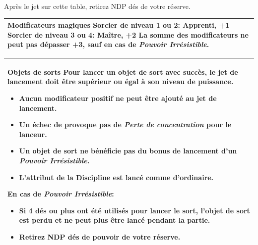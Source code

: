 \begin{table}[h!]
\begin{minipage}[t]{.5\linewidth}
\bigskip
Après le jet sur cette table, retirez NDP dés de votre réserve.
\smallskip

\begin{tabular}{|m{8cm}|}
\hline
\textbf{Modificateurs magiques}
\newline Sorcier de niveau 1 ou 2: Apprenti, +1
\newline Sorcier de niveau 3 ou 4: Maître, +2
\newline La somme des modificateurs ne peut pas dépasser +3, sauf en cas de \emph{Pouvoir Irrésistible}. \tabularnewline
\hline
\end{tabular}

\bigskip

\begin{tabular}{|m{8cm}|}
\hline
\textbf{Objets de sorts}
\newline Pour lancer un objet de sort avec succès, le jet de lancement doit être supérieur ou égal à son niveau de puissance.
\smallskip
\begin{itemize}
\item Aucun modificateur positif ne peut être ajouté au jet de lancement.
\item Un échec de provoque pas de \emph{Perte de concentration} pour le lanceur.
\item Un objet de sort ne bénéficie pas du bonus de lancement d'un \emph{Pouvoir Irrésistible}.
\item L'attribut de la Discipline est lancé comme d'ordinaire.
\end{itemize}
En cas de \emph{Pouvoir Irrésistible}:
\begin{itemize}
\item Si 4 dés ou plus ont été utilisés pour lancer le sort, l'objet de sort est perdu et ne peut plus être lancé pendant la partie.
\item Retirez NDP dés de pouvoir de votre réserve.
\end{itemize}
\tabularnewline
\hline
\end{tabular}

\end{minipage}
\end{table}

